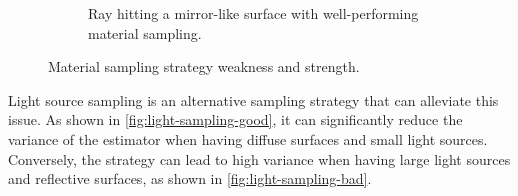 \begin{figure}[H]
\begin{subfigure}[t]{0.45\textwidth}
    \caption{Ray hitting a mirror-like surface with well-performing material sampling.}
    \label{fig:material-sampling-good}
  \end{subfigure}
  \caption{Material sampling strategy weakness and strength.}
  \label{fig:material-sampling}
\end{figure}

Light source sampling is an alternative sampling strategy that can alleviate this issue. As shown in \autoref{fig:light-sampling-good}, it can significantly reduce the variance of the estimator when having diffuse surfaces and small light sources. Conversely, the strategy can lead to high variance when having large light sources and reflective surfaces, as shown in \autoref{fig:light-sampling-bad}.

